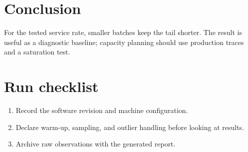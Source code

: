 \documentclass[lang=en]{sjtureport}
\begin{document}
\chapter{Conclusion}
For the tested service rate, smaller batches keep the tail shorter. The result
is useful as a diagnostic baseline; capacity planning should use production
traces and a saturation test.

\appendix
\chapter{Run checklist}
\begin{enumerate}
  \item Record the software revision and machine configuration.
  \item Declare warm-up, sampling, and outlier handling before looking at results.
  \item Archive raw observations with the generated report.
\end{enumerate}
\end{document}
